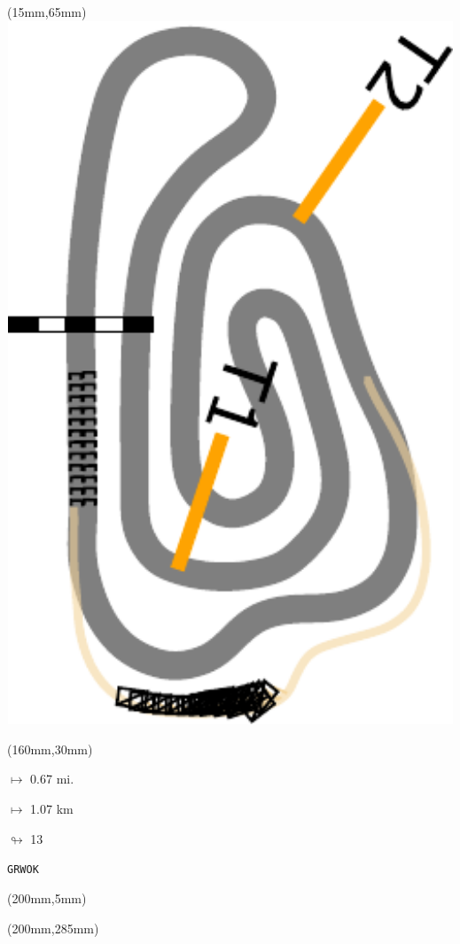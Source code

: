 \begin{textblock*}{185mm}(15mm,65mm)%
\centering
\mbox{\includegraphics[width=185mm,height=210mm,keepaspectratio]{PT/GRWOK.pdf}}
\end{textblock*}
\begin{textblock*}{40mm}(160mm,30mm)%
\Large
\par$\mapsto$ 0.67 mi.
\par$\mapsto$ 1.07 km
\par$\looparrowright$ 13
\par\hfill\tiny\tt GRWOK\\
\end{textblock*}
\begin{textblock*}{20mm}(200mm,5mm)%
\fbox{\thepage}
\label{GRWOK}
\end{textblock*}
\begin{textblock*}{20mm}(200mm,285mm)%
\fbox{\thepage}
\end{textblock*}

